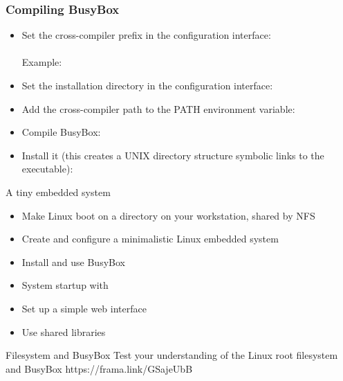 \begin{frame}
  \frametitle{Compiling BusyBox}
  \begin{itemize}
  \item Set the cross-compiler prefix in the configuration interface: \\
    \\
    Example: 
  \item Set the installation directory in the configuration interface: \\
  \item Add the cross-compiler path to the PATH environment variable:\\
  \item Compile BusyBox:\\
  \item Install it (this creates a UNIX directory structure symbolic
    links to the  executable):\\
  \end{itemize}
\end{frame}

\setuplabframe
{A tiny embedded system}
{
  \begin{itemize}
  \item Make Linux boot on a directory on your workstation, shared by NFS
  \item Create and configure a minimalistic Linux embedded system
  \item Install and use BusyBox
  \item System startup with 
  \item Set up a simple web interface
  \item Use shared libraries
  \end{itemize}
}

\quizframe
{Filesystem and BusyBox}
{Test your understanding of the Linux root filesystem and BusyBox}
{https://frama.link/GSajeUbB}
